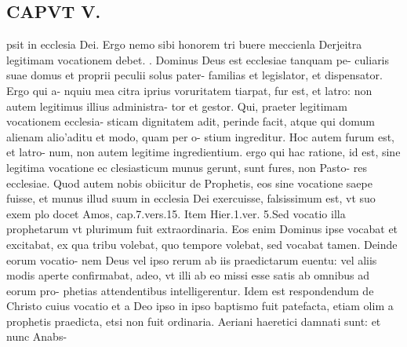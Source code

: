 \documentclass{article}
\begin{document}
\begin{pages}
\section*{CAPVT V. }
\marginpar{[ p.343 ]}\pstart psit in ecclesia Dei. Ergo nemo sibi honorem tri buere meccienla Derjeitra legitimam vocationem debet.  \pend{}. Dominus Deus est ecclesiae tanquam pe- culiaris suae domus et proprii peculii solus pater- familias et legislator, et dispensator. Ergo qui a- nquiu mea citra iprius voruritatem tiarpat, fur est, et latro: non autem legitimus illius administra- tor et gestor.  \pend{} Qui, praeter legitimam vocationem ecclesia- sticam dignitatem adit, perinde facit, atque qui domum alienam alio’aditu et modo, quam per o- stium ingreditur. Hoc autem furum est, et latro- num, non autem legitime ingredientium. ergo qui hac ratione, id est, sine legitima vocatione ec clesiasticum munus gerunt, sunt fures, non Pasto- res ecclesiae.  \pend\pstart Quod autem nobis obiicitur de Prophetis, eos sine vocatione saepe fuisse, et munus illud suum in ecclesia Dei exercuisse, falsissimum est, vt suo exem plo docet Amos, cap.7.vers.15. Item Hier.1.ver. 5.Sed vocatio illa prophetarum vt plurimum fuit extraordinaria. Eos enim Dominus ipse vocabat et excitabat, ex qua tribu volebat, quo tempore volebat, sed vocabat tamen. Deinde eorum vocatio- nem Deus vel ipso rerum ab iis praedictarum euentu: vel aliis modis aperte confirmabat, adeo, vt illi ab eo missi esse satis ab omnibus ad eorum pro- phetias attendentibus intelligerentur. Idem est respondendum de Christo cuius vocatio et a Deo ipso in ipso baptismo fuit patefacta, etiam olim a prophetis praedicta, etsi non fuit ordinaria.  \pend\pstart Aeriani haeretici damnati sunt: et nunc Anabs-  \pend

\end{pages}
\end{document}
